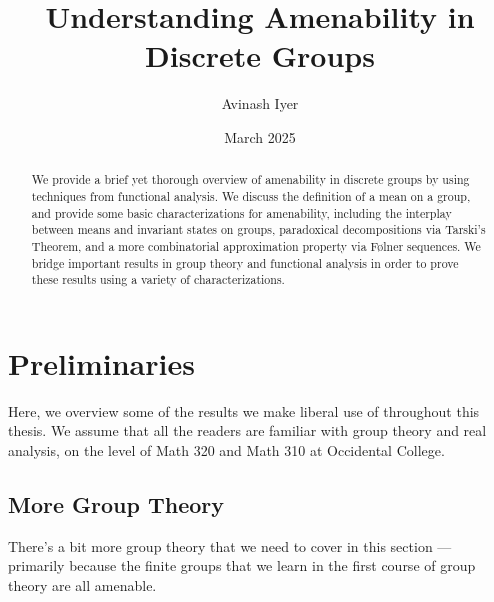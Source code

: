 \documentclass[10pt]{mypackage2}
\title{Understanding Amenability in Discrete Groups}
\author{Avinash Iyer}
\date{March 2025}
\begin{document}
\maketitle
\RaggedRight
\begin{abstract}
  We provide a brief yet thorough overview of amenability in discrete groups by using techniques from functional analysis. We discuss the definition of a mean on a group, and provide some basic characterizations for amenability, including the interplay between means and invariant states on groups, paradoxical decompositions via Tarski's Theorem, and a more combinatorial approximation property via Følner sequences. We bridge important results in group theory and functional analysis in order to prove these results using a variety of characterizations.
\end{abstract}
\section{Preliminaries}%
Here, we overview some of the results we make liberal use of throughout this thesis. We assume that all the readers are familiar with group theory and real analysis, on the level of Math 320 and Math 310 at Occidental College.
\subsection{More Group Theory}%
There's a bit more group theory that we need to cover in this section --- primarily because the finite groups that we learn in the first course of group theory are all amenable.\newline
\end{document}
